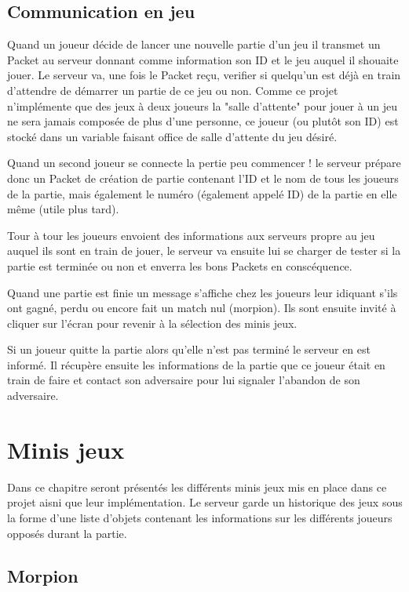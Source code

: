 \documentclass{report}
\begin{document}
\section{Communication en jeu}

Quand un joueur décide de lancer une nouvelle partie d'un jeu il transmet un Packet au serveur donnant comme information son ID et le jeu
auquel il shouaite jouer. Le serveur va, une fois le Packet reçu, verifier si quelqu'un est déjà en train d'attendre de démarrer un partie de ce jeu
ou non. Comme ce projet n'implémente que des jeux à deux joueurs la "salle d'attente" pour jouer à un jeu ne sera jamais composée de plus d'une personne,
ce joueur (ou plutôt son ID) est stocké dans un variable faisant office de salle d'attente du jeu désiré.

Quand un second joueur se connecte la pertie peu commencer ! le serveur prépare donc un Packet de création de partie contenant l'ID et le nom de tous les
joueurs de la partie, mais également le numéro (également appelé ID) de la partie en elle même (utile plus tard).

Tour à tour les joueurs envoient des informations aux serveurs propre au jeu auquel ils sont en train de jouer, le serveur va ensuite lui se charger de
tester si la partie est terminée ou non et enverra les bons Packets en conscéquence.

Quand une partie est finie un message s'affiche chez les joueurs leur idiquant s'ils ont gagné, perdu ou encore fait un match nul (morpion). Ils sont
ensuite invité à cliquer sur l'écran pour revenir à la sélection des minis jeux.

Si un joueur quitte la partie alors qu'elle n'est pas terminé le serveur en est informé. Il récupère ensuite les informations de la partie que
ce joueur était en train de faire et contact son adversaire pour lui signaler l'abandon de son adversaire.

\chapter{Minis jeux}
Dans ce chapitre seront présentés les différents minis jeux mis en place dans
ce projet aisni que leur implémentation.
Le serveur garde un historique des jeux sous la forme d'une liste d'objets
contenant les informations sur les différents joueurs opposés durant la partie.

\section{Morpion}
\label{Morpion}
\end{document}
